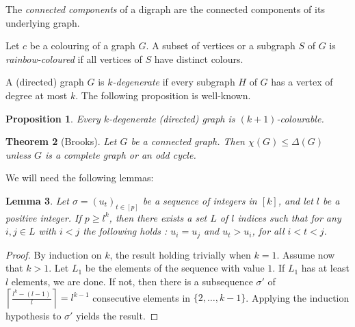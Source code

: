 \documentclass[utf8,10pt]{article}
\theoremstyle{plain}
\newtheorem{theorem}{Theorem}
\newtheorem{lemma}[theorem]{Lemma}
\newtheorem{proposition}[theorem]{Proposition}
\theoremstyle{definition}
\theoremstyle{remark}
\begin{document}
The {\it connected components} of a digraph are the connected components of its underlying graph.

Let $c$ be a colouring of a graph $G$. A subset of vertices or a subgraph $S$ of $G$ is {\it rainbow-coloured} if all vertices of $S$ have distinct colours.


A (directed) graph $G$ is {\it $k$-degenerate} if every subgraph $H$ of $G$ has a vertex of degree at most $k$.
The following proposition is well-known.
\begin{proposition}\label{prop:deg}
Every $k$-degenerate (directed) graph is $(k+1)$-colourable.
\end{proposition}

\begin{theorem}[Brooks]\label{thm:brooks}
Let $G$ be a connected graph.
Then $\chi(G)\leq \Delta(G)$ unless $G$ is a complete graph or an odd cycle.
\end{theorem}






We will need the following lemmas:

%
%

\begin{lemma}\label{min}
Let $\sigma=(u_t)_{t\in [p]}$ be a sequence of integers in $[k]$, and let $l$ be a positive integer. If $p\geq l^k$, then there exists a set $L$ of $l$ indices such that for any $i,j \in L$ with $i < j$ the following holds : $u_i=u_j$ and $u_t > u_i$, for all $i < t < j$. \end{lemma}

\begin{proof}
By induction on $k$, the result holding trivially when $k=1$. Assume now that $k>1$. Let $L_1$ be the elements of the sequence with value $1$. If $L_1$ has at least $l$ elements, we are done.
If not, then there is a subsequence $\sigma'$ of $\left\lceil \frac{l^k-(l-1)}{l}\right \rceil = l^{k-1}$ consecutive elements in $\{2, \dots , k-1\}$. Applying the induction hypothesis to $\sigma'$ yields the result.
\end{proof}
\end{document}
